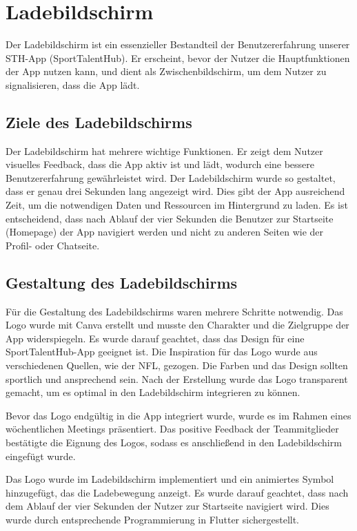 \chapter{Ladebildschirm}

Der Ladebildschirm ist ein essenzieller Bestandteil der Benutzererfahrung unserer STH-App (SportTalentHub). Er erscheint, bevor der Nutzer die Hauptfunktionen der App nutzen kann, und dient als Zwischenbildschirm, um dem Nutzer zu signalisieren, dass die App lädt.

\section*{Ziele des Ladebildschirms}
Der Ladebildschirm hat mehrere wichtige Funktionen. Er zeigt dem Nutzer visuelles Feedback, dass die App aktiv ist und lädt, wodurch eine bessere Benutzererfahrung gewährleistet wird. Der Ladebildschirm wurde so gestaltet, dass er genau drei Sekunden lang angezeigt wird. Dies gibt der App ausreichend Zeit, um die notwendigen Daten und Ressourcen im Hintergrund zu laden. \newline
Es ist entscheidend, dass nach Ablauf der vier Sekunden die Benutzer zur Startseite (Homepage) der App navigiert werden und nicht zu anderen Seiten wie der Profil- oder Chatseite.

\section*{Gestaltung des Ladebildschirms}
Für die Gestaltung des Ladebildschirms waren mehrere Schritte notwendig. Das Logo wurde mit Canva erstellt und musste den Charakter und die Zielgruppe der App widerspiegeln. \newline
Es wurde darauf geachtet, dass das Design für eine SportTalentHub-App geeignet ist. Die Inspiration für das Logo wurde aus verschiedenen Quellen, wie der NFL, gezogen. Die Farben und das Design sollten sportlich und ansprechend sein. \newline
Nach der Erstellung wurde das Logo transparent gemacht, um es optimal in den Ladebildschirm integrieren zu können.

Bevor das Logo endgültig in die App integriert wurde, wurde es im Rahmen eines wöchentlichen Meetings präsentiert. Das positive Feedback der Teammitglieder bestätigte die Eignung des Logos, sodass es anschließend in den Ladebildschirm eingefügt wurde.

Das Logo wurde im Ladebildschirm implementiert und ein animiertes Symbol hinzugefügt, das die Ladebewegung anzeigt. \newline
Es wurde darauf geachtet, dass nach dem Ablauf der vier Sekunden der Nutzer zur Startseite navigiert wird. Dies wurde durch entsprechende Programmierung in Flutter sichergestellt.

